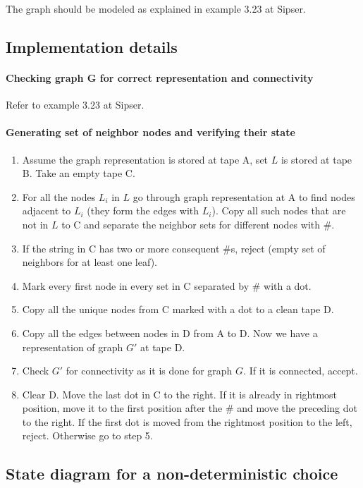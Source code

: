 \documentclass[a4paper, notitlepage]{article}
\begin{document}
The graph should be modeled as explained in example 3.23 at Sipser.

\subsection{Implementation details}

\paragraph{Checking graph G for correct representation and connectivity}

Refer to example 3.23 at Sipser.

\paragraph{Generating set of neighbor nodes and verifying their state}

\begin{enumerate}
\item Assume the graph representation is stored at tape A, set $L$ is stored at tape B. Take an empty tape C.
\item For all the nodes $L_i$ in $L$ go through graph representation at A to find nodes adjacent to $L_i$ (they form the edges with $L_i$). Copy all such nodes that are not in $L$ to C and separate the neighbor sets for different nodes with \#.
\item If the string in C has two or more consequent \#s, reject (empty set of neighbors for at least one leaf).
\item Mark every first node in every set in C separated by \# with a dot.
\item Copy all the unique nodes from C marked with a dot to a clean tape D. 
\item Copy all the edges between nodes in D from A to D. Now we have a representation of graph $G'$ at tape D. 
\item Check $G'$ for connectivity as it is done for graph $G$. If it is connected, accept.
\item Clear D. Move the last dot in C to the right. If it is already in rightmost position, move it to the first position after the \# and move the preceding dot to the right. If the first dot is moved from the rightmost position to the left, reject. Otherwise go to step 5.
\end{enumerate}

\subsection{State diagram for a non-deterministic choice}
\end{document}
